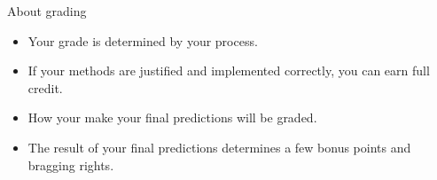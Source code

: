 \documentclass[
  10pt,
  ignorenonframetext,
]{beamer}
\providecommand{\tightlist}{%
  \setlength{\itemsep}{0pt}\setlength{\parskip}{0pt}}
\begin{document}
\begin{frame}{About grading}
\protect\hypertarget{about-grading}{}
\begin{itemize}
\tightlist
\item
  Your grade is determined by your process.
\item
  If your methods are justified and implemented correctly, you can earn
  full credit.
\item
  How your make your final predictions will be graded.
\item
  The result of your final predictions determines a few bonus points and
  bragging rights.
\end{itemize}
\end{frame}
\end{document}
